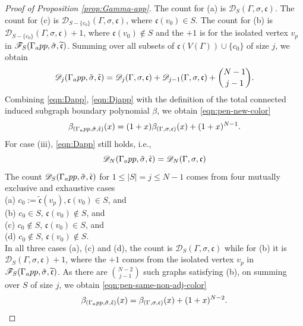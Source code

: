 \documentclass[10pt,a4paper]{amsart}
\newcommand{\hf}{\hspace*{0.5cm}}
\begin{document}
\begin{proof}[Proof of Proposition \ref{prop:Gamma-app}]
The count for (a) is $\mathscr{D}_S(\Gamma,\sigma,\mathfrak{c})$. The count for (c) is $\mathscr{D}_{S-\{c_0\}}(\Gamma,\sigma,\mathfrak{c})$, where $\mathfrak{c}(v_0)\in S$. The count for (b) is $\mathscr{D}_{S-\{c_0\}}(\Gamma,\sigma,\mathfrak{c})+1$, where $\mathfrak{c}(v_0)\not\in S$ and the $+1$ is for the isolated vertex $v_p$ in $\mathscr{F}_S(\Gamma_\textup{app},\tilde{\sigma},\widetilde{\mathfrak{c}})$. Summing over all subsets of $\mathfrak{c}(V(\Gamma))\cup\{c_0\}$ of size $j$, we obtain
\begin{equation}\label{eqn:Djapp}
\mathscr{D}_j(\Gamma_\textup{app},\tilde{\sigma},\tilde{\mathfrak{c}})=\mathscr{D}_{j}(\Gamma,\sigma,\mathfrak{c})+\mathscr{D}_{j-1}(\Gamma,\sigma,\mathfrak{c})+{N-1\choose j-1}.
\end{equation}
Combining \eqref{eqn:Dapp}, \eqref{eqn:Djapp} with the definition of the total connected induced subgraph boundary polynomial ${\beta}$, we obtain \eqref{eqn:pen-new-color}
\begin{equation*}
{\beta}_{(\Gamma_\textup{app},\tilde{\sigma},\tilde{\mathfrak{c}})}(x)=(1+x){\beta}_{(\Gamma,\sigma,\mathfrak{c})}(x)+(1+x)^{N-1}. 
\end{equation*}
\hf For case (iii), \eqref{eqn:Dapp} still holds, i.e.,
\begin{equation*}%
\mathscr{D}_{N}(\Gamma_\textup{app},\tilde{\sigma},\tilde{\mathfrak{c}})=\mathscr{D}_N(\Gamma,\sigma,\mathfrak{c})
\end{equation*}
The count $\mathscr{D}_S(\Gamma_\textup{app},\tilde{\sigma},\tilde{\mathfrak{c}})$ for $1\leq |S|=j\leq N-1$ comes from four mutually exclusive and exhaustive cases\\
\hf (a) $c_0:=\tilde{\mathfrak{c}}(v_p),\mathfrak{c}(v_0)\in S$, and\\
\hf (b) $c_0\in S$, $\mathfrak{c}(v_0)\not\in S$, and\\
\hf (c) $c_0\not\in S$, $\mathfrak{c}(v_0)\in S$, and\\
\hf (d) $c_0\not\in S$, $\mathfrak{c}(v_0)\not\in S$.\\
In all three cases (a), (c) and (d), the count is $\mathscr{D}_S(\Gamma,\sigma,\mathfrak{c})$ while for (b) it is $\mathscr{D}_S(\Gamma,\sigma,\mathfrak{c})+1$, where the $+1$ comes from the isolated vertex $v_p$ in $\mathscr{F}_S(\Gamma_\textup{app},\tilde{\sigma},\widetilde{\mathfrak{c}})$. As there are ${N-2 \choose j-1}$ such graphs satisfying (b), on summing over $S$ of size $j$, we obtain \eqref{eqn:pen-same-non-adj-color}
\begin{equation*}
{\beta}_{(\Gamma_\textup{app},\tilde{\sigma},\tilde{\mathfrak{c}})}(x)={\beta}_{(\Gamma,\sigma,\mathfrak{c})}(x)+(1+x)^{N-2}. 
\end{equation*}
\end{proof}
\end{document}
